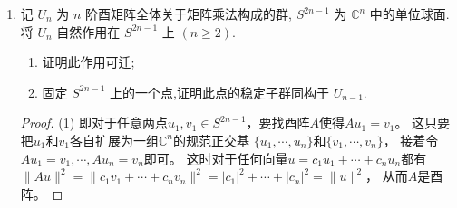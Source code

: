 \begin{enumerate}
\begin{proof}
    (2) 这样的问法其实太随意了，因为两个集合之间有一一对应从字面意思看就是基数相同而已，
    那么既然两者的基数都是连续统，就能有一一对应，然而这道题肯定不是要问这个；
    本题的实际意思大概是要给出这个等价类集合与$S^2$之间的一个起码不太人为的一一映射。
    不过这样讲还是很模糊，还是没说清楚到底是要干些什么；
    可能一个比较好的问法是再要求这个映射保持某种额外的结构，比如说构造一个两者之间的同胚。

    尽管如此，本题究竟是什么意思还是能大致猜出来的；
    归根结底就是个脑筋急转弯，而且是要转两次的那种。
    一方面，球面$S^2$通过球极投影变成了射影复平面$\mathbb{CP}^1=\mathbb{C}\cup\{\infty\}$；
    另一方面，$S^3=\{(z_1,z_2)\in\mathbb{C}^2\bigm||z_1|^2+|z_2|^2=1\}$
    相当于$\mathbb{C}^2\setminus\{(0,0)\}$商掉长度的伸缩$(z_1,z_2)\sim(rz_1,rz_2)$，
    那么继续商掉$e^{{\rm i}\theta}$的群作用后就等于是$\mathbb{C}^2\setminus\{(0,0)\}$
    商掉$\mathbb{C}\setminus\{0\}=\{re^{{\rm i}\theta} \mid r>0\}$，也就是射影复平面$\mathbb{CP}^1$。
\end{proof}
\item 记 $U_n$ 为 $n$ 阶酉矩阵全体关于矩阵乘法构成的群, 
$S^{2n-1}$ 为 $\mathbb{C}^n$ 中的单位球面.
将 $U_n$ 自然作用在 $S^{2n-1}$ 上 $(n \geqslant 2)$.
\begin{enumerate}[label=(\arabic*)]
\item 证明此作用可迁;
\item 固定 $S^{2n-1}$ 上的一个点,证明此点的稳定子群同构于 $U_{n-1}$.
\end{enumerate}
\begin{proof}
    (1) 即对于任意两点$u_1,v_1 \in S^{2n-1}$，要找酉阵$A$使得$Au_1=v_1$。
    这只要把$u_1$和$v_1$各自扩展为一组$\mathbb{C}^n$的规范正交基
    $\{u_1,\cdots,u_n\}$和$\{v_1,\cdots,v_n\}$，
    接着令$Au_1=v_1,\cdots,Au_n=v_n$即可。
    这时对于任何向量$u=c_1u_1+\cdots+c_nu_n$都有
    $\|Au\|^2=\|c_1v_1+\cdots+c_nv_n\|^2=|c_1|^2+\cdots+|c_n|^2=\|u\|^2$，
    从而$A$是酉阵。


\end{proof}
\end{enumerate}
